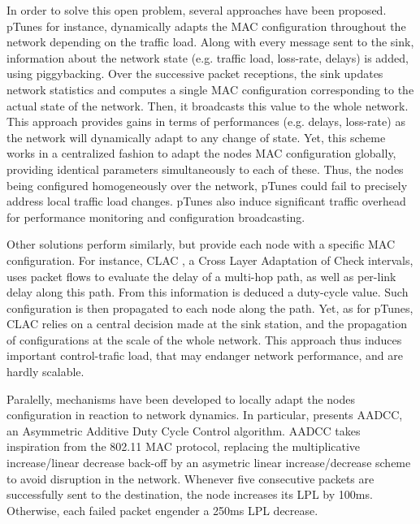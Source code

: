 \documentclass[12pt,journal,compsoc]{IEEEtran}
\begin{document}
In order to solve this open problem, several approaches have been proposed. pTunes \cite{zfm12ptunes} for instance, dynamically adapts the MAC configuration throughout the network depending on the traffic load. Along with every message sent to the sink, information about the network state (e.g. traffic load, loss-rate, delays) is added, using piggybacking. Over the successive packet receptions, the sink updates network statistics and computes a single MAC configuration corresponding to the actual state of the network. Then, it broadcasts this value to the whole network. 
This approach provides gains in terms of performances (e.g. delays, loss-rate) as the network will dynamically adapt to any change of state. Yet, this scheme works in a centralized fashion to adapt the nodes MAC configuration globally, providing identical parameters simultaneously to each of these. Thus, the nodes being configured homogeneously over the network, pTunes could fail to precisely address local traffic load changes. pTunes also induce significant traffic overhead for performance monitoring and configuration broadcasting. 


Other solutions perform similarly, but provide each node with a specific MAC configuration. For instance, CLAC \cite{ecc12cross}, a Cross Layer Adaptation of Check intervals, uses packet flows to evaluate the delay of a multi-hop path, as well as per-link delay along this path. From this information is deduced a duty-cycle value. Such configuration is then propagated to each node along the path. Yet, as for pTunes, CLAC relies on a central decision made at the sink station, and the propagation of configurations at the scale of the whole network. This approach thus induces important control-trafic load, that may endanger network performance, and are hardly scalable.


Paralelly, mechanisms have been developed to locally adapt the nodes configuration in reaction to network dynamics. In particular, \cite{mh10duty} presents AADCC, an Asymmetric Additive Duty Cycle Control algorithm.
AADCC takes inspiration from the 802.11 MAC protocol, replacing the multiplicative increase/linear decrease back-off by an asymetric linear increase/decrease scheme to avoid disruption in the network. Whenever five consecutive packets are successfully sent to the destination, the node increases its LPL by 100ms. Otherwise, each failed packet engender a 250ms LPL decrease. 
\end{document}
